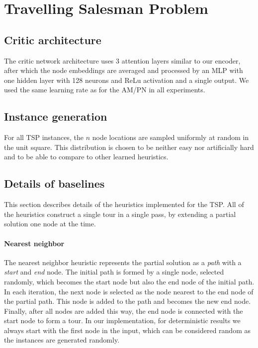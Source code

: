 \section{Travelling Salesman Problem}
\subsection{Critic architecture}
\label{sec:appendix_tsp_critic}
The critic network architecture uses 3 attention layers similar to our encoder, after which the node embeddings are averaged and processed by an MLP with one hidden layer with 128 neurons and ReLu activation and a single output. We used the same learning rate as for the AM/PN in all experiments.

\subsection{Instance generation}
For all TSP instances, the $n$ node locations are sampled uniformly at random in the unit square. This distribution is chosen to be neither easy nor artificially hard and to be able to compare to other learned heuristics.

\subsection{Details of baselines}
\label{sec:appendix_baselines}
This section describes details of the heuristics implemented for the TSP. All of the heuristics construct a single tour in a single pass, by extending a partial solution one node at the time.

\paragraph{Nearest neighbor}
The nearest neighbor heuristic represents the partial solution as a \emph{path} with a \emph{start} and \emph{end} node. The initial path is formed by a single node, selected randomly, which becomes the start node but also the end node of the initial path. In each iteration, the next node is selected as the node nearest to the end node of the partial path. This node is added to the path and becomes the new end node. Finally, after all nodes are added this way, the end node is connected with the start node to form a tour. In our implementation, for deterministic results we always start with the first node in the input, which can be considered random as the instances are generated randomly.

